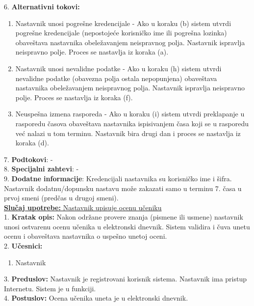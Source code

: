 \documentclass{article}
\begin{document}
6. \textbf{Alternativni tokovi:}
\begin{enumerate} [label=(\roman*)]
\item Nastavnik unosi pogrešne kredencijale - Ako u koraku (b) sistem utvrdi pogrešne kredencijale (nepostojeće korisničko ime ili pogrešna lozinka) obaveštava nastavnika obeležavanjem neispravnog polja. Nastavnik ispravlja neispravno polje. Proces se nastavlja iz koraka (a).
\item Nastavnik unosi nevalidne podatke - Ako u koraku (h) sistem utvrdi nevalidne podatke (obavezna polja ostala nepopunjena) obaveštava nastavnika obeležavanjem neispravnog polja. Nastavnik ispravlja neispravno polje. Proces se nastavlja iz koraka (f).
\item Neuspešna izmena rasporeda - Ako u koraku (i) sistem utvrdi preklapanje u rasporedu časova obaveštava nastavnika ispisivanjem časa koji se u rasporedu već nalazi u tom terminu. Nastavnik bira drugi dan i proces se nastavlja iz koraka (d).

\end{enumerate}

7. \textbf{Podtokovi}: - \\

8. \textbf{Specijalni zahtevi}: - \\

9. \textbf{Dodatne informacije}: Kredencijali nastavnika su korisničko ime i šifra. Nastavnik dodatnu/dopunsku nastavu može zakazati samo u terminu 7. časa u prvoj smeni (predčas u drugoj smeni). \\

\underline{\textbf{Slučaj upotrebe:} Nastavnik upisuje ocenu učeniku} \\

1. \textbf{Kratak opis:} Nakon održane provere znanja (pismene ili usmene) nastavnik unosi ostvarenu ocenu učenika u elektronski dnevnik. Sistem validira i čuva unetu ocenu i obaveštava nastavnika o uspešno unetoj oceni.  \\

2. \textbf{Učesnici:}
\begin{enumerate} [label=(\alph*)]
\item Nastavnik
\end{enumerate} 

3. \textbf{Preduslov:} Nastavnik je registrovani korisnik sistema. Nastavnik ima pristup Internetu. Sistem je u funkciji. \\

4. \textbf{Postuslov:} Ocena učenika uneta je u elektronski dnevnik. \\
\end{document}
